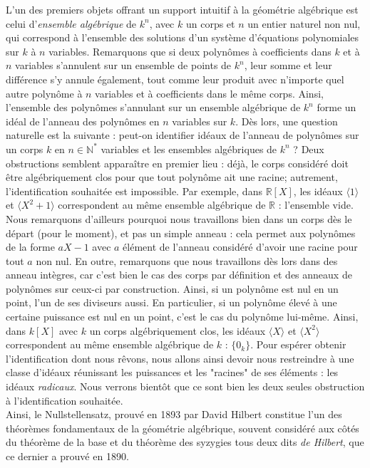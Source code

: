 \documentclass[10pt, twoside]{article}
\theoremstyle{plain}
\theoremstyle{definition}
\theoremstyle{plain}
\theoremstyle{plain}
\theoremstyle{definition}
\theoremstyle{remark}
\begin{document}
L'un des premiers objets offrant un support intuitif à la géométrie algébrique est celui d'\textit{ensemble algébrique} de $k^n$, avec $k$ un corps et $n$ un entier naturel non nul, qui correspond à l'ensemble des solutions d'un système d'équations polynomiales sur $k$ à $n$ variables. Remarquons que si deux polynômes à coefficients dans $k$ et à $n$ variables s'annulent sur un ensemble de points de $k^n$, leur somme et leur différence s'y annule également, tout comme leur produit avec n'importe quel autre polynôme à $n$ variables et à coefficients dans le même corps. Ainsi, l'ensemble des polynômes s'annulant sur un ensemble algébrique de $k^n$ forme un idéal de l'anneau des polynômes en $n$ variables sur $k$. Dès lors, une question naturelle est la suivante : peut-on identifier idéaux de l'anneau de polynômes sur un corps $k$ en $n \in \mathbb{N}^*$ variables et les ensembles algébriques de $k^n$ ? Deux obstructions semblent apparaître en premier lieu : déjà, le corps considéré doit être algébriquement clos pour que tout polynôme ait une racine; autrement, l'identification souhaitée est impossible. Par exemple, dans $\mathbb{R}[X]$, les idéaux $\langle 1 \rangle$ et $\langle X^2 + 1 \rangle$ correspondent au même ensemble algébrique de $\mathbb{R}$ : l'ensemble vide. Nous remarquons d'ailleurs pourquoi nous travaillons bien dans un corps dès le départ (pour le moment), et pas un simple anneau : cela permet aux polynômes de la forme $aX-1$ avec $a$ élément de l'anneau considéré d'avoir une racine pour tout $a$ non nul. En outre, remarquons que nous travaillons dès lors dans des anneau intègres, car c'est bien le cas des corps par définition et des anneaux de polynômes sur ceux-ci par construction. Ainsi, si un polynôme est nul en un point, l'un de ses diviseurs aussi. En particulier, si un polynôme élevé à une certaine puissance est nul en un point, c'est le cas du polynôme lui-même. Ainsi, dans $k[X]$ avec $k$ un corps algébriquement clos, les idéaux $\langle X \rangle$ et $\langle X^2 \rangle$ correspondent au même ensemble algébrique de $k$ : $\{ 0_k \}$. Pour espérer obtenir l'identification dont nous rêvons, nous allons ainsi devoir nous restreindre à une classe d'idéaux réunissant les puissances et les "racines" de ses éléments : les idéaux \textit{radicaux}. Nous verrons bientôt que ce sont bien les deux seules obstruction à l'identification souhaitée.\\
Ainsi, le Nullstellensatz, prouvé en 1893 par David Hilbert constitue l'un des théorèmes fondamentaux de la géométrie algébrique, souvent considéré aux côtés du théorème de la base et du théorème des syzygies tous deux dits \textit{de Hilbert}, que ce dernier a prouvé en 1890.\\
\end{document}
